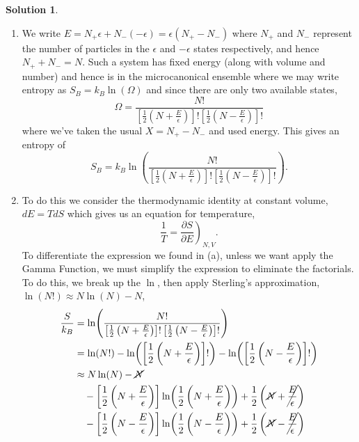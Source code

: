 \documentclass[10pt]{article}
\theoremstyle{definition}
\newtheorem{soln}{Solution}
\begin{document}
\begin{soln}~
  \begin{enumerate}[label=(\alph*)]
    \item We write $E=N_{+}\epsilon+N_{-}(-\epsilon)=\epsilon\left(N_+-N_-\right)$ where $N_+$ and $N_-$ represent the number of
          particles in the $\epsilon$ and $-\epsilon$ states respectively, and hence $N_++N_-=N$. Such a system has fixed energy (along with volume and number)
          and hence is in the microcanonical ensemble where we may write entropy as $S_B=k_B\ln(\Omega)$ and since there are only two available states,
          $$\Omega=\frac{N!}{\left[\frac{1}{2}\left(N+\frac{E}{\epsilon}\right)\right]!\left[\frac{1}{2}\left(N-\frac{E}{\epsilon}\right)\right]!}$$
          where we've taken the usual $X=N_+-N_-$ and used energy. This gives an entropy of
          $$S_B=k_B\ln(\frac{N!}{\left[\frac{1}{2}\left(N+\frac{E}{\epsilon}\right)\right]!\left[\frac{1}{2}\left(N-\frac{E}{\epsilon}\right)\right]!}).$$
    \item To do this we consider the thermodynamic identity at constant volume,
          $dE=TdS$ which gives us an equation for temperature,
          $$\frac{1}{T}=\left.\frac{\partial S}{\partial E}\right)_{N,V}.$$
          To differentiate the expression we found in (a), unless we want apply the Gamma Function, we must simplify the expression to eliminate the factorials.
          To do this, we break up the $\ln$, then apply Sterling's approximation, $\ln(N!)\approx N\ln(N)-N$,
          \begin{align*}
            \frac{S}{k_B} & =\ln(\frac{N!}{\left[\frac{1}{2}\left(N+\frac{E}{\epsilon}\right)\right]!\left[\frac{1}{2}\left(N-\frac{E}{\epsilon}\right)\right]!})                                           \\
                          & =\ln(N!)-\ln(\left[\frac{1}{2}\left(N+\frac{E}{\epsilon}\right)\right]!)-\ln(\left[\frac{1}{2}\left(N-\frac{E}{\epsilon}\right)\right]!)                                        \\
                          & \approx N\ln(N)-\cancel{N}                                                                                                                                                      \\
                          & \quad-\left[\frac{1}{2}\left(N+\frac{E}{\epsilon}\right)\right]\ln(\frac{1}{2}\left(N+\frac{E}{\epsilon}\right))+\frac{1}{2}\left(\cancel{N}+\cancel{\frac{E}{\epsilon}}\right) \\
                          & \quad-\left[\frac{1}{2}\left(N-\frac{E}{\epsilon}\right)\right]\ln(\frac{1}{2}\left(N-\frac{E}{\epsilon}\right))+\frac{1}{2}\left(\cancel{N}-\cancel{\frac{E}{\epsilon}}\right) \\

\end{align*}
\end{enumerate}
\end{soln}
\end{document}
